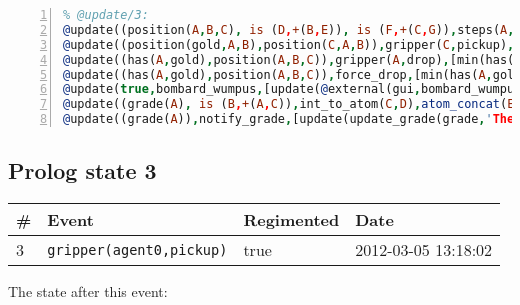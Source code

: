 \documentclass[11pt]{article}\usepackage[utf8]{inputenc}\usepackage{geometry}
\begin{document}
\begin{lstlisting}[language=Prolog, numbers=left]
% Rules with string id: @update
% @update/3:
@update((position(A,B,C), is (D,+(B,E)), is (F,+(C,G)),steps(A,H), is (I,+(H,1.0))),move(A,E,G),[min(position(A,B,C)),plus(position(A,D,F)),min(steps(A,H)),plus(steps(A,I))|[]])
@update((position(gold,A,B),position(C,A,B)),gripper(C,pickup),[plus(has(C,gold)),min(position(gold,A,B))|[]])
@update((has(A,gold),position(A,B,C)),gripper(A,drop),[min(has(A,gold)),plus(position(gold,B,C))|[]])
@update((has(A,gold),position(A,B,C)),force_drop,[min(has(A,gold)),plus(position(gold,B,C)),update(@external(gui,gripper,D))|[]])
@update(true,bombard_wumpus,[update(@external(gui,bombard_wumpus,A)),min(alive(wumpus))|[]])
@update((grade(A), is (B,+(A,C)),int_to_atom(C,D),atom_concat(E,D,F)),update_grade(G,E,C),[min(grade(A)),plus(grade(B)),update(@external(gui,show_notice(G,F),H))|[]])
@update((grade(A)),notify_grade,[update(update_grade(grade,'The end result: ',A))|[]])

\end{lstlisting}
\clearpage 
\subsection{Prolog state 3}
\begin{table}[ht]
\centering 
\begin{tabular}{l l l l} 
\textbf{\#} & \textbf{Event} & \textbf{Regimented} & \textbf{Date} \\ [0.5ex] 
\hline
3&\texttt{gripper(agent0,pickup)}&true&2012-03-05 13:18:02\\ [1ex] \hline\end{tabular}
\end{table}
The state after this event:
\end{document}
